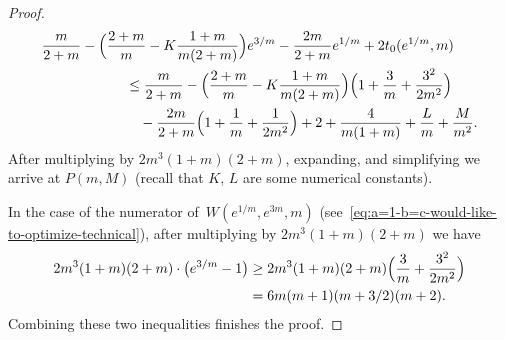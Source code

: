 \documentclass[a4paper]{amsart} %
\theoremstyle{definition}
\theoremstyle{remark}
\numberwithin{equation}{section}
\newcommand*{\XXXspecialbd}{W}
\begin{document}
\begin{proof}
	\begin{align*}
	\MoveEqLeft[6]
	\frac{m}{2+m} -\Bigl(\frac{2+m}{m} - K \frac{1+m}{m(2+m)}\Bigr)e^{3/m}
	- \frac{2m}{2+m} e^{1/m} 
	+ 2t_0(e^{1/m},m)\\
	&\leq 
	\frac{m}{2+m} 
	-\Bigl(\frac{2+m}{m} - K \frac{1+m}{m(2+m)}\Bigr)\Bigl( 1 + \frac{3}{m} + \frac{3^2}{2 m^2}\Bigr)\\
	&\quad - \frac{2m}{2+m} \Bigl( 1 + \frac{1}{m} + \frac{1}{2 m^2}\Bigr) + 2 + \frac{4}{m(1+m)} + \frac{L}{m} + \frac{M}{m^2}.
	\end{align*}
	After multiplying by $2m^3(1+m)(2+m)$, expanding, and simplifying we arrive at
	$P(m,M)$
	(recall that $K$, $L$ are some numerical constants).
	
	In the case of the numerator of~$\XXXspecialbd(e^{1/m}, e^{3m}, m)$ (see~\eqref{eq:a=1-b=c-would-like-to-optimize-technical}), 
	after multiplying by  $2m^3(1+m)(2+m)$ we have
	\begin{align*}
	2m^3(1+m)(2+m)\cdot \bigl(e^{3/m} -1\bigr)
	&\geq 2m^3(1+m)(2+m) \Bigl( \frac{3}{m}  + \frac{3^2}{2m^2}\Bigr) \\
	&= 6m(m+1)(m+3/2)(m+2).
	\end{align*}
	Combining these two inequalities finishes the proof.
\end{proof}
\end{document}
